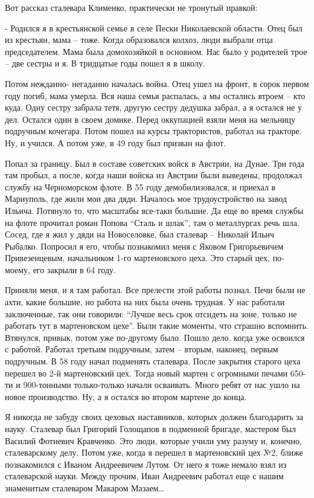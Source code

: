 Вот рассказ сталевара Клименко, практически не тронутый правкой:

- Родился я в крестьянской семье в селе Пески Николаевской области. Отец был из
крестьян, мама – тоже. Когда образовался колхоз, люди выбрали отца
председателем. Мама была домохозяйкой в основном. Нас было у родителей трое –
две сестры и я. В тридцатые годы пошел я в школу.

Потом нежданно- негаданно началась война. Отец ушел на фронт, в сорок первом
году погиб, мама умерла. Вся наша семья распалась, а мы остались втроем – кто
куда. Одну сестру забрала тетя, другую сестру дедушка забрал, а я остался не у
дел. Остался один в своем домике. Перед оккупацией взяли меня на мельницу
подручным кочегара. Потом пошел на курсы трактористов, работал на тракторе. Ну,
и учился. А потом уже, в 49 году был призван на флот.

Попал за границу. Был в составе советских войск в Австрии, на Дунае. Три года
там пробыл, а после, когда наши войска из Австрии были выведены, продолжал
службу на Черноморском флоте. В 55 году демобилизовался, и приехал в Мариуполь,
где жили мои два дяди. Началось мое трудоустройство на завод Ильича. Потянуло
то, что масштабы все-таки большие. Да еще во время службы на флоте прочитал
роман Попова \enquote{Сталь и шлак}, там о металлургах речь шла. Сосед, где я жил у
дяди на Новоселовке, был сталевар – Николай Ильич Рыбалко. Попросил я его,
чтобы познакомил меня с Яковом Григорьевичем Привезенцевым, начальником 1-го
мартеновского цеха. Это старый цех, по-моему, его закрыли в 64 году.

Приняли меня, и я там работал. Все прелести этой работы познал. Печи были не
ахти, какие большие, но работа на них была очень трудная. У нас работали
заключенные, так они говорили: \enquote{Лучше весь срок отсидеть на зоне, только не
работать тут в мартеновском цехе}. Были такие моменты, что страшно вспомнить.
Втянулся, привык, потом уже по-другому было. Пошло дело, когда уже освоился с
работой. Работал третьим подручным, затем – вторым, наконец,  первым подручным.
В 58 году начал подменять сталевара. После закрытия старого цеха перешел во 2-й
мартеновский цех. Тогда новый мартен с огромными печами 650-ти и 900-тонными
только-только начали осваивать. Много ребят от нас ушло на новое производство.
Ну, а я остался во втором мартене до конца.

Я никогда не забуду своих цеховых наставников, которых должен благодарить за
науку. Сталевар был Григорий Голощапов в подменной бригаде, мастером был
Василий Фотиевич Кравченко. Это люди, которые учили уму разуму и, конечно,
сталеварскому делу. Потом уже, когда я перешел в мартеновский цех №2, ближе
познакомился с Иваном Андреевичем Лутом. От него я тоже немало взял из
сталеварской науки. Между прочим, Иван Андреевич работал еще с нашим знаменитым
сталеваром Макаром Мазаем…

